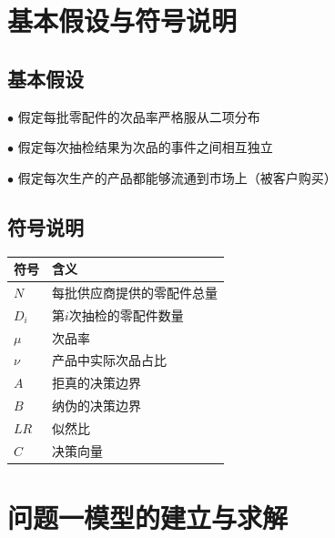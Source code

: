 \documentclass[withoutpreface,bwprint]{cumcmthesis} %
\begin{document}
\section{基本假设与符号说明}
\subsection{基本假设}
$\bullet$ 假定每批零配件的次品率严格服从二项分布

$\bullet$ 假定每次抽检结果为次品的事件之间相互独立

$\bullet$ 假定每次生产的产品都能够流通到市场上（被客户购买）

\subsection{符号说明}
\begin{longtable}{m{3.5cm}<{\centering}m{10cm}<{\centering}}
	\toprule[1.5pt]
	\textbf{符号} & \textbf{含义}   \\ \midrule[1pt]
	\endfirsthead
	\endhead
	$N$         & 每批供应商提供的零配件总量 \\
	$D_{i}$     & 第$i$次抽检的零配件数量 \\
	$\mu$       & 次品率           \\
	$\nu$       & 产品中实际次品占比     \\
	$A$         & 拒真的决策边界       \\
	$B$         & 纳伪的决策边界       \\
	$LR$        & 似然比           \\
	$C$         & 决策向量          \\
	\bottomrule[1.5pt]
\end{longtable}

\section{问题一模型的建立与求解}
\end{document}
